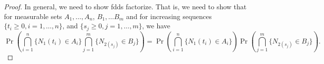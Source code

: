 \documentclass[a4paper,10pt]{article}
\begin{document}
\begin{proof}
In general, we need to show fdds factorize. That is, we need to show that for measurable sets $A_1, \hdots, A_n$, $B_1, \hdots B_m$ and for increasing sequences $\{t_i \geqslant 0, i = 1, \ldots, n\}$, and $\{s_j \geqslant 0, j = 1, \ldots, m\}$, we have \begin{equation*}
   \Pr\left(\bigcap_{i=1}^n\{N_{1}(t_{i})\in A_{i}\}\bigcap_{j=1}^m\{N_{2(s_{j})}\in B_{j}\}\right)
   =\Pr\left(\bigcap_{i=1}^n\{N_{1}(t_{i})\in A_{i}\}\right)\Pr\left(\bigcap_{j=1}^m\{N_{2(s_{j})}\in B_{j}\}\right).
\end{equation*}
\end{proof}
\end{document}
